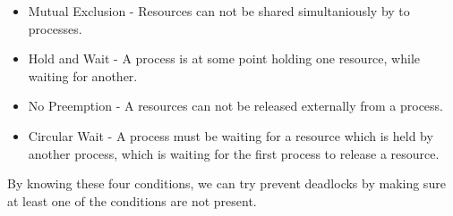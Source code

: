 \begin{itemize}
\item Mutual Exclusion - Resources can not be shared simultaniously by to processes.
\item Hold and Wait - A process is at some point holding one resource, while waiting for another.
\item No Preemption - A resources can not be released externally from a process.
\item Circular Wait - A process must be waiting for a resource which is held by another process, which is waiting for the first process to release a resource.
\end{itemize}

By knowing these four conditions, we can try prevent deadlocks by making sure at least one of the conditions are not present.